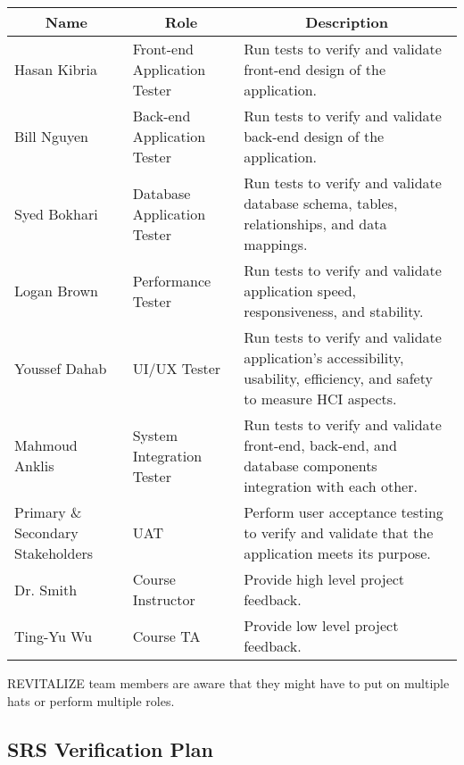 \documentclass[12pt, titlepage]{article}
\begin{document}

\begin{table}[H]
	\centering
	\begin{tabular}{|p{3cm}|p{4cm}|p{7cm}|}
		\hline
		\multicolumn{1}{|c|}{\textbf{Name}} & \multicolumn{1}{|c|}{\textbf{Role}} & \multicolumn{1}{|c|}{\textbf{Description}}
		\\ \hline
		Hasan Kibria & Front-end Application Tester & Run tests to verify and validate front-end design of the application.
		\\ \hline
		Bill Nguyen & Back-end Application Tester & Run tests to verify and validate back-end design of the application.
		\\ \hline
		Syed Bokhari & Database Application Tester & Run tests to verify and validate database schema, tables, relationships, and data mappings. 
		\\ \hline
		Logan Brown & Performance Tester & Run tests to verify and validate application speed, responsiveness, and stability.
		\\ \hline
		Youssef Dahab & UI/UX Tester & Run tests to verify and validate application's accessibility, usability, efficiency, and safety to measure HCI aspects.
		\\ \hline  
		Mahmoud Anklis & System Integration Tester & Run tests to verify and validate front-end, back-end, and database components integration with each other.
		\\ \hline
		Primary \& Secondary Stakeholders & UAT & Perform user acceptance testing to verify and validate that the application meets its purpose.
		\\ \hline
		Dr. Smith & Course Instructor & Provide high level project feedback.
		\\ \hline
		Ting-Yu Wu & Course TA & Provide low level project feedback.
		\\ \hline
	\end{tabular}
\end{table}

REVITALIZE team members are aware that they might have to put on multiple hats or perform multiple roles.

\subsection{SRS Verification Plan}
\end{document}
